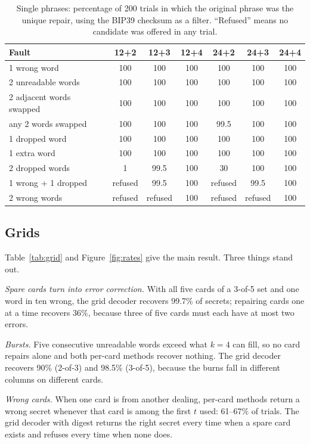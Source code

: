 \documentclass[numeric]{anvil-paper}
\begin{document}
\begin{table}[tb]
\centering
\caption{Single phrases: percentage of 200 trials in which the original phrase
was the unique repair, using the BIP39 checksum as a filter. ``Refused'' means
no candidate was offered in any trial.}
\label{tab:single}
\small
\begin{tabular}{lcccccc}
\toprule
Fault & 12+2 & 12+3 & 12+4 & 24+2 & 24+3 & 24+4 \\
\midrule
1 wrong word & 100 & 100 & 100 & 100 & 100 & 100 \\
2 unreadable words & 100 & 100 & 100 & 100 & 100 & 100 \\
2 adjacent words swapped & 100 & 100 & 100 & 100 & 100 & 100 \\
any 2 words swapped & 100 & 100 & 100 & 99.5 & 100 & 100 \\
1 dropped word & 100 & 100 & 100 & 100 & 100 & 100 \\
1 extra word & 100 & 100 & 100 & 100 & 100 & 100 \\
2 dropped words & 1 & 99.5 & 100 & 30 & 100 & 100 \\
1 wrong + 1 dropped & refused & 99.5 & 100 & refused & 99.5 & 100 \\
2 wrong words & refused & refused & 100 & refused & refused & 100 \\
\bottomrule
\end{tabular}
\end{table}

\subsection{Grids}

Table~\ref{tab:grid} and Figure~\ref{fig:rates} give the main result. Three
things stand out.

\emph{Spare cards turn into error correction.} With all five cards of a 3-of-5
set and one word in ten wrong, the grid decoder recovers 99.7\% of secrets;
repairing cards one at a time recovers 36\%, because three of five cards must
each have at most two errors.

\emph{Bursts.} Five consecutive unreadable words exceed what $k=4$ can fill, so
no card repairs alone and both per-card methods recover nothing. The grid
decoder recovers 90\% (2-of-3) and 98.5\% (3-of-5), because the burns fall in
different columns on different cards.

\emph{Wrong cards.} When one card is from another dealing, per-card methods
return a wrong secret whenever that card is among the first $t$ used: 61--67\%
of trials. The grid decoder with digest returns the right secret every time
when a spare card exists and refuses every time when none does.
\end{document}
